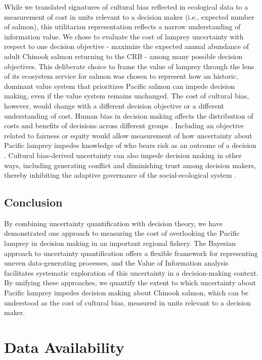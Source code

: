 \documentclass{article}
\begin{document}
While we translated signatures of cultural bias reflected in ecological data to a measurement of cost in units relevant to a decision maker (i.e., expected number of salmon), this utilitarian representation reflects a narrow understanding of information value. We chose to evaluate the cost of lamprey uncertainty with respect to one decision objective - maximize the expected annual abundance of adult Chinook salmon returning to the CRB - among many possible decision objectives. This deliberate choice to frame the value of lamprey through the lens of its ecosystem service for salmon was chosen to represent how an historic, dominant value system that prioritizes Pacific salmon can impede decision making, even if the value system remains unchanged. The cost of cultural bias, however, would change with a different decision objective or a different understanding of cost. Human bias in decision making affects the distribution of costs and benefits of decisions across different groups \parencite{okamoto2020attending}. Including an objective related to fairness or equity would allow measurement of how uncertainty about Pacific lamprey impedes knowledge of who bears risk as an outcome of a decision \parencite{lockwood2010governance}. Cultural bias-derived uncertainty can also impede decision making in other ways, including generating conflict and diminishing trust among decision makers, thereby inhibiting the adaptive governance of the social-ecological system \parencite{folke2005adaptive}. 

\subsection*{Conclusion}

By combining uncertainty quantification with decision theory, we have demonstrated one approach to measuring the cost of overlooking the Pacific lamprey in decision making in an important regional fishery. The Bayesian approach to uncertainty quantification offers a flexible framework for representing uneven data-generating processes, and the Value of Information analysis facilitates systematic exploration of this uncertainty in a decision-making context. By unifying these approaches, we quantify the extent to which uncertainty about Pacific lamprey impedes decision making about Chinook salmon, which can be understood as the cost of cultural bias, measured in units relevant to a decision maker.


\section*{Data Availability}
\end{document}
